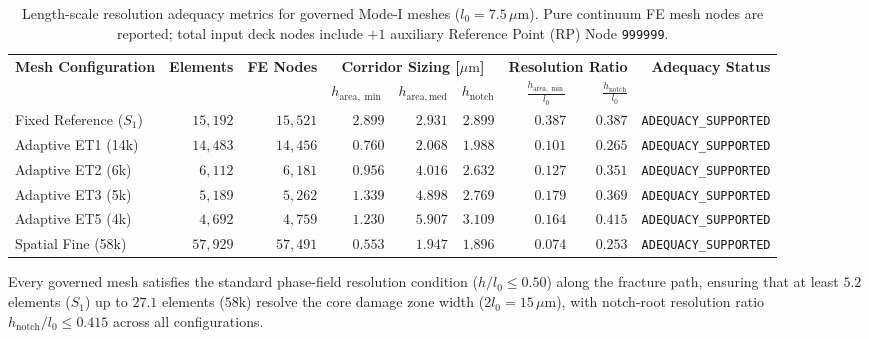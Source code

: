 \begin{table}[htbp]
\centering
\caption{Length-scale resolution adequacy metrics for governed Mode-I meshes ($l_0 = 7.5\,\mu\mathrm{m}$). Pure continuum FE mesh nodes are reported; total input deck nodes include $+1$ auxiliary Reference Point (RP) Node \texttt{999999}.}
\label{tab:governed_mesh_adequacy_pack}
\small
\begin{tabular}{lrrrrrrrr}
\toprule
\textbf{Mesh Configuration} & \textbf{Elements} & \textbf{FE Nodes} & \multicolumn{3}{c}{\textbf{Corridor Sizing [$\mu\mathrm{m}$]}} & \multicolumn{2}{c}{\textbf{Resolution Ratio}} & \textbf{Adequacy Status} \\
\cmidrule(lr){4-6} \cmidrule(lr){7-8}
 & & & $h_{\mathrm{area},\min}$ & $h_{\mathrm{area},\mathrm{med}}$ & $h_{\mathrm{notch}}$ & $\frac{h_{\mathrm{area},\min}}{l_0}$ & $\frac{h_{\mathrm{notch}}}{l_0}$ & \\
\midrule
Fixed Reference ($S_1$) & $15{,}192$ & $15{,}521$ & $2.899$ & $2.931$ & $2.899$ & $\mathbf{0.387}$ & $\mathbf{0.387}$ & \texttt{ADEQUACY\_SUPPORTED} \\
Adaptive ET1 (14k) & $14{,}483$ & $14{,}456$ & $0.760$ & $2.068$ & $1.988$ & $\mathbf{0.101}$ & $\mathbf{0.265}$ & \texttt{ADEQUACY\_SUPPORTED} \\
Adaptive ET2 (6k) & $6{,}112$ & $6{,}181$ & $0.956$ & $4.016$ & $2.632$ & $\mathbf{0.127}$ & $\mathbf{0.351}$ & \texttt{ADEQUACY\_SUPPORTED} \\
Adaptive ET3 (5k) & $5{,}189$ & $5{,}262$ & $1.339$ & $4.898$ & $2.769$ & $\mathbf{0.179}$ & $\mathbf{0.369}$ & \texttt{ADEQUACY\_SUPPORTED} \\
Adaptive ET5 (4k) & $4{,}692$ & $4{,}759$ & $1.230$ & $5.907$ & $3.109$ & $\mathbf{0.164}$ & $\mathbf{0.415}$ & \texttt{ADEQUACY\_SUPPORTED} \\
Spatial Fine (58k) & $57{,}929$ & $57{,}491$ & $0.553$ & $1.947$ & $1.896$ & $\mathbf{0.074}$ & $\mathbf{0.253}$ & \texttt{ADEQUACY\_SUPPORTED} \\
\bottomrule
\end{tabular}
\end{table}

Every governed mesh satisfies the standard phase-field resolution condition ($h/l_0 \le 0.50$) along the fracture path, ensuring that at least $5.2$ elements ($S_1$) up to $27.1$ elements ($58\mathrm{k}$) resolve the core damage zone width ($2 l_0 = 15\,\mu\mathrm{m}$), with notch-root resolution ratio $h_{\mathrm{notch}}/l_0 \le 0.415$ across all configurations.

